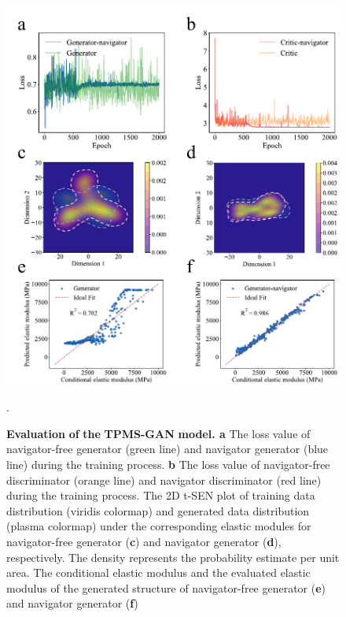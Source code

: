 \documentclass[preprint,review,12pt,authoryear]{elsarticle}
\begin{document}
\begin{figure}
    \centering
    \includegraphics[width=0.75\linewidth]{figures/4.pdf}
    \caption{\textbf{Evaluation} \textbf{of} \textbf{the} \textbf{TPMS-GAN} \textbf{model. a} The loss value of navigator-free generator (green line) and navigator generator (blue line) during the training process. \textbf{b} The loss value of navigator-free discriminator (orange line) and navigator discriminator (red line) during the training process. The 2D t-SEN plot of training data distribution (viridis colormap) and generated data distribution (plasma colormap) under the corresponding elastic modules for navigator-free generator (\textbf{c}) and navigator generator (\textbf{d}), respectively. The density represents the probability estimate per unit area. The conditional elastic modulus and the evaluated elastic modulus of the generated structure of navigator-free generator (\textbf{e}) and navigator generator (\textbf{f})}.
    \label{fig:4}
\end{figure}
\end{document}
